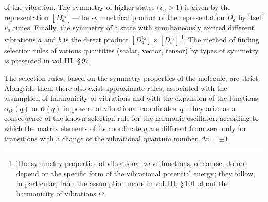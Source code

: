of the vibration. The symmetry of higher states ($v_a > 1$) is given by the representation $[D^{v_a}_a]$---the symmetrical product of the representation $D_a$ by itself $v_a$ times. Finally, the symmetry of a state with simultaneously excited different vibrations $a$ and $b$ is the direct product $[D^{v_a}_a] \times [D^{v_b}_b]$\,\footnote{The symmetry properties of vibrational wave functions, of course, do not depend on the specific form of the vibrational potential energy; they follow, in particular, from the assumption made in vol.\,III, \S\,101 about the harmonicity of vibrations.}. The method of finding selection rules of various quantities (scalar, vector, tensor) by types of symmetry is presented in vol.\,III, \S\,97.

The selection rules, based on the symmetry properties of the molecule, are strict. Alongside them there also exist approximate rules, associated with the assumption of harmonicity of vibrations and with the expansion of the functions $\alpha_{ik}(q)$ or $\mathbf{d}(q)$ in powers of vibrational coordinates~$q$. They arise as a consequence of the known selection rule for the harmonic oscillator, according to which the matrix elements of its coordinate $q$ are different from zero only for transitions with a change of the vibrational quantum number $\Delta v = \pm 1$.
